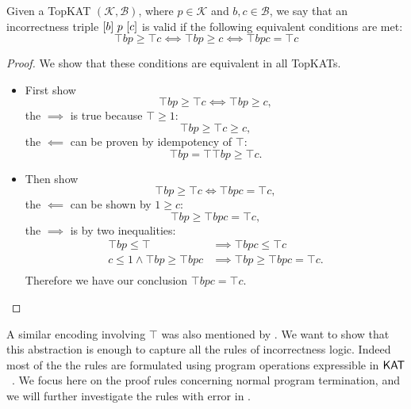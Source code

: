 \begin{theorem}
  Given a TopKAT \((𝒦, ℬ)\), where \(p ∈ 𝒦\) and
  \(b, c ∈ ℬ\), we say that an incorrectness triple
  \([b]~p~[c]\) is valid if the following equivalent conditions are
  met:
  \[⊤ b p ≥ ⊤ c ⟺ ⊤ b p ≥ c ⟺ ⊤ b p c = ⊤ c\]
\end{theorem}

\begin{proof}
We show that these conditions are equivalent in all TopKATs.
\begin{itemize}
    \item First show \[⊤ b p ≥ ⊤ c ⟺ ⊤ b p ≥ c,\]
    the \(⟹\) is true because \(⊤ ≥ 1\):
    \[\top b p \geq \top c \geq c,\]
    the \(\impliedby\) can be proven by idempotency of \(\top\):
    \[\top b p = \top \top b p \geq \top c.\]
    \item Then show \[\top b p \geq \top c \iff \top b p c = \top c,\]
    the \(\impliedby\) can be shown by \(1 \geq c\):
    \[\top b p \geq \top b p c = \top c,\]
    the \(\implies\) is by two inequalities:
    \begin{align*}
        \top b p \leq \top & \implies \top b p c \leq \top c \\
        c \leq 1 \land \top b p \geq \top b p c & \implies \top b p \geq \top b p c = \top c.\\
    \end{align*}
    Therefore we have our conclusion \(\top b p c = \top c\). \qedhere
\end{itemize}
\end{proof}

A similar encoding involving \(\top\) was also mentioned by \citet{OHearn_2020}.
We want to show that this abstraction is enough to capture all the rules of
incorrectness logic.  Indeed most of the the rules are formulated using program
operations expressible in \(\mathsf{KAT}\) ~\cite{OHearn_2020}.  We
focus here on the proof rules concerning normal program termination, and we will
further investigate the rules with error in .


